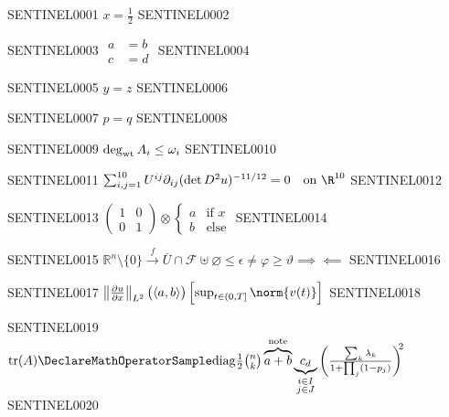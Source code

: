 \documentclass{article}
\begin{document}
SENTINEL0001 $ \begin{equation}\label{eq:num} x = \frac{1}{2} \end{equation} $ SENTINEL0002

SENTINEL0003 $ \begin{align}\label{eq:num2} a &= b \\ c &= d \end{align} $ SENTINEL0004

SENTINEL0005 $ y = z \tag{star} $ SENTINEL0006

SENTINEL0007 $ \begin{equation*} p = q \end{equation*} $ SENTINEL0008

SENTINEL0009 $ \deg_{\rm wt}A_i\le\omega_i $ SENTINEL0010

SENTINEL0011 $ \sum_{i,j=1}^{10}U^{ij}\partial_{ij}(\det D^2u)^{-11/12}=0 \quad\hbox{on }\R^{10} $ SENTINEL0012

SENTINEL0013 $ \begin{pmatrix} 1 & 0 \\ 0 & 1 \end{pmatrix} \otimes \begin{cases} a &\text{if } x\\ b &\text{else}\end{cases} $ SENTINEL0014

SENTINEL0015 $ \mathbb{R}^n \setminus \{0\} \xrightarrow{f} \overline{U} \cap \mathcal{F} \uplus \varnothing \le \epsilon \ne \varphi \ge \vartheta \implies \impliedby $ SENTINEL0016

SENTINEL0017 $ \left\| \frac{\partial u}{\partial x} \right\|_{L^2} \bigl( \langle a, b \rangle \bigr) \left[ \sup_{t \in (0,T]} \norm{v(t)} \right] $ SENTINEL0018

SENTINEL0019 $ \operatorname{tr}(A) \DeclareMathOperatorSample \mathrm{diag} \tfrac12 \binom{n}{k} \overbrace{a+b}^{\text{note}} \underbrace{c_d}_{\substack{i \in I \\ j \in J}} \left( \frac{ \sum_{k} \lambda_k }{ 1 + \prod_{j} (1 - p_j) } \right)^{\!\!2} $ SENTINEL0020
\end{document}
